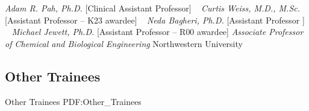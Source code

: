 \GapNoBreak
{}
\textit{Adam R. Pah, Ph.D.}
    [Clinical Assistant Professor]
\newline
~
\Gap{}
\textit{Curtis Weiss, M.D., M.Sc.}
    [Assistant Professor -- K23 awardee]
\newline
~
\Gap{}
\textit{Neda Bagheri, Ph.D.}
    [Assistant Professor ]
\newline
~
\Gap{}
\textit{Michael Jewett, Ph.D.}
    [Assistant Professor -- R00 awardee]
\newline
    \textit{Associate Professor of Chemical and Biological Engineering}
    \newline
    Northwestern University
    \newline
~
\Gap\vspace*{0.2cm}\subsection
{Other Trainees}
{Other Trainees}
{PDF:Other_Trainees}

